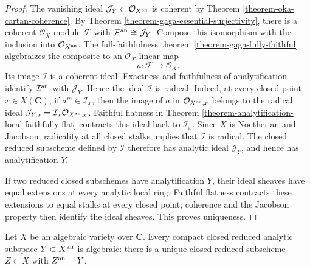 \begin{proof}
The vanishing ideal $\mathcal J_Y\subset\mathcal O_{X^{\rm an}}$ is
coherent by Theorem \ref{theorem-oka-cartan-coherence}. By Theorem
\ref{theorem-gaga-essential-surjectivity}, there is a coherent
$\mathcal O_X$-module $\mathcal F$ with
$\mathcal F^{\rm an}\cong\mathcal J_Y$. Compose this isomorphism with the
inclusion into $\mathcal O_{X^{\rm an}}$. The full-faithfulness theorem
\ref{theorem-gaga-fully-faithful} algebraizes the composite to an
$\mathcal O_X$-linear map
$$
u:\mathcal F\longrightarrow\mathcal O_X.
$$
Its image $\mathcal I$ is a coherent ideal. Exactness and faithfulness of
analytification identify $\mathcal I^{\rm an}$ with $\mathcal J_Y$. Hence
the ideal $\mathcal I$ is radical. Indeed, at every closed point
$x\in X(\mathbf C)$, if $a^m\in\mathcal I_x$, then the image of $a$ in
$\mathcal O_{X^{\rm an},x}$ belongs to the radical ideal
$\mathcal J_{Y,x}=\mathcal I_x\mathcal O_{X^{\rm an},x}$. Faithful
flatness in Theorem \ref{theorem-analytification-local-faithfully-flat}
contracts this ideal back to $\mathcal I_x$. Since $X$ is Noetherian and
Jacobson, radicality at all closed stalks implies that $\mathcal I$ is
radical. The closed reduced subscheme defined by $\mathcal I$ therefore has
analytic ideal $\mathcal J_Y$, and hence has analytification $Y$.

If two reduced closed subschemes have analytification $Y$, their ideal
sheaves have equal extensions at every analytic local ring. Faithful
flatness contracts these extensions to equal stalks at every closed point;
coherence and the Jacobson property then identify the ideal sheaves. This
proves uniqueness.
\end{proof}

\begin{proposition}
\label{proposition-compact-analytic-subspace-algebraic}
\begin{reference}
\cite[\S 4, no. 19, Proposition 14]{GAGA}
\end{reference}
Let $X$ be an algebraic variety over $\mathbf C$. Every compact
closed reduced analytic subspace $Y\subset X^{\rm an}$ is algebraic: there
is a unique closed reduced subscheme $Z\subset X$ with
$Z^{\rm an}=Y$.
\end{proposition}

